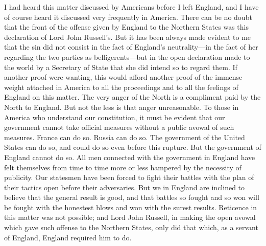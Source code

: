 I had heard this matter discussed by Americans before I left
England, and I have of course heard it discussed very frequently in
America.  There can be no doubt that the front of the offense given
by England to the Northern States was this declaration of Lord John
Russell's.  But it has been always made evident to me that the sin
did not consist in the fact of England's neutrality---in the fact of
her regarding the two parties as belligerents---but in the open
declaration made to the world by a Secretary of State that she did
intend so to regard them.  If another proof were wanting, this
would afford another proof of the immense weight attached in
America to all the proceedings and to all the feelings of England
on this matter.  The very anger of the North is a compliment paid
by the North to England.  But not the less is that anger
unreasonable.  To those in America who understand our constitution,
it must be evident that our government cannot take official
measures without a public avowal of such measures.  France can do
so.  Russia can do so.  The government of the United States can do
so, and could do so even before this rupture.  But the government
of England cannot do so.  All men connected with the government in
England have felt themselves from time to time more or less
hampered by the necessity of publicity.  Our statesmen have been
forced to fight their battles with the plan of their tactics open
before their adversaries.  But we in England are inclined to
believe that the general result is good, and that battles so fought
and so won will be fought with the honestest blows and won with the
surest results.  Reticence in this matter was not possible; and
Lord John Russell, in making the open avowal which gave such
offense to the Northern States, only did that which, as a servant
of England, England required him to do.

